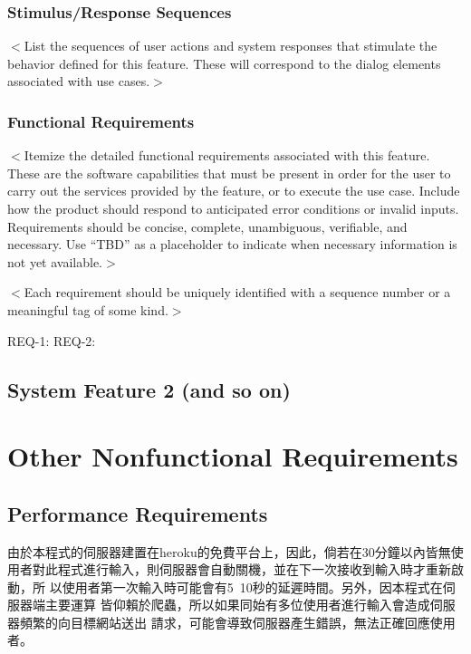 \documentclass{scrreprt}
\begin{document}
\subsection{Stimulus/Response Sequences}
\begin{CJK}{UTF8}{<font>}
$<$List the sequences of user actions and system responses that stimulate the 
behavior defined for this feature. These will correspond to the dialog elements 
associated with use cases.$>$
\end{CJK}

\subsection{Functional Requirements}
\begin{CJK}{UTF8}{<font>}
$<$Itemize the detailed functional requirements associated with this feature.  
These are the software capabilities that must be present in order for the user 
to carry out the services provided by the feature, or to execute the use case.  
Include how the product should respond to anticipated error conditions or 
invalid inputs. Requirements should be concise, complete, unambiguous, 
verifiable, and necessary. Use “TBD” as a placeholder to indicate when necessary 
information is not yet available.$>$
\end{CJK}

$<$Each requirement should be uniquely identified with a sequence number or a 
meaningful tag of some kind.$>$

REQ-1:	REQ-2:

\section{System Feature 2 (and so on)}


\chapter{Other Nonfunctional Requirements}

\section{Performance Requirements}
\begin{CJK}{UTF8}{<font>}
由於本程式的伺服器建置在heroku的免費平台上，因此，倘若在30分鐘以內皆無使
用者對此程式進行輸入，則伺服器會自動關機，並在下一次接收到輸入時才重新啟動，所
以使用者第一次輸入時可能會有5~10秒的延遲時間。另外，因本程式在伺服器端主要運算
皆仰賴於爬蟲，所以如果同始有多位使用者進行輸入會造成伺服器頻繁的向目標網站送出
請求，可能會導致伺服器產生錯誤，無法正確回應使用者。
\end{CJK}
\end{document}
